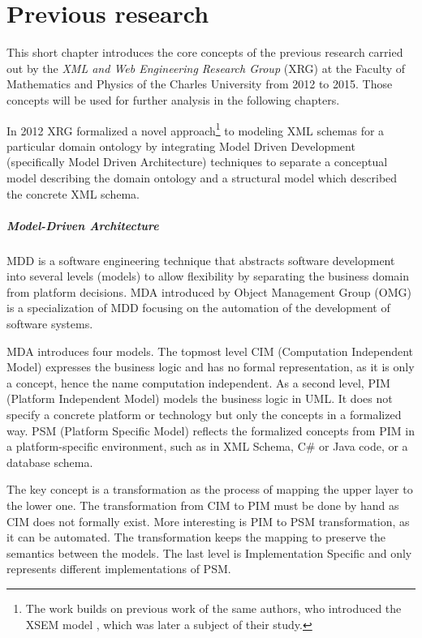 \chapter{Previous research}
\label{chapters:previous-research}

This short chapter introduces the core concepts of the previous research carried out by the \textit{XML and Web Engineering Research Group} (XRG) at the Faculty of Mathematics and Physics of the Charles University from 2012 to 2015. Those concepts will be used for further analysis in the following chapters.

\bigskip

In 2012 XRG formalized a novel approach\footnote{The work builds on previous work of the same authors, who introduced the XSEM model \cite{necasky2007xsem}, which was later a subject of their study.} to modeling XML schemas \cite{necasky2012conceptual} for a particular domain ontology by integrating Model Driven Development \cite{kent2002model} (specifically Model Driven Architecture) techniques to separate a conceptual mo\-del describing the domain ontology and a structural model which described the concrete XML schema.

\paragraph{Model-Driven Architecture} MDD is a software engineering technique that abstracts software development into several levels (models) to allow flexibility by separating the business domain from platform decisions. MDA \cite{mda,mda_developing_in} introduced by Object Management Group (OMG) is a specialization of MDD focusing on the automation of the development of software systems.

MDA introduces four models. The topmost level CIM (Computation Independent Model) expresses the business logic and has no formal representation, as it is only a concept, hence the name computation independent. As a second level, PIM (Platform Independent Model) models the business logic in UML. It does not specify a concrete platform or technology but only the concepts in a formalized way. PSM (Platform Specific Model) reflects the formalized concepts from PIM in a platform-specific environment, such as in XML Schema, C\# or Java code, or a database schema.

The key concept is a transformation as the process of mapping the upper layer to the lower one. The transformation from CIM to PIM must be done by hand as CIM does not formally exist. More interesting is PIM to PSM transformation, as it can be automated. The transformation keeps the mapping to preserve the semantics between the models. The last level is Implementation Specific and only represents different implementations of PSM.

